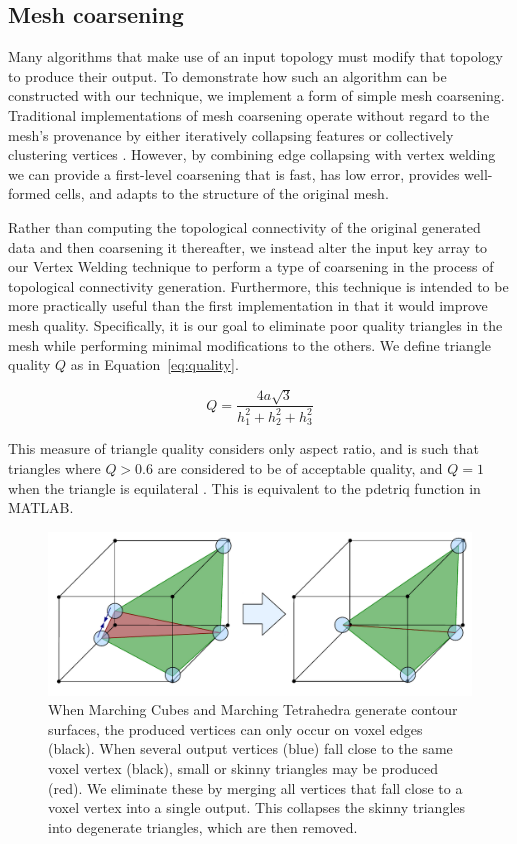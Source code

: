 \documentclass[review,journal]{vgtc}         %
\begin{document}
\subsection{Mesh coarsening}
\label{sec:coarsening}
Many algorithms that make use of an input topology must modify that topology to produce their output. To demonstrate how such an algorithm can be constructed with our technique, we implement a form of simple mesh coarsening. Traditional implementations of mesh coarsening operate without regard to the mesh's provenance by either iteratively collapsing features \cite{Potter2011} or collectively clustering vertices \cite{DeCoro2007}.  However, by combining edge collapsing with vertex welding we can provide a first-level coarsening that is fast, has low error, provides well-formed cells, and adapts to the structure of the original mesh.

Rather than computing the topological connectivity of the original generated data and then coarsening it thereafter, we instead alter the input key array to our Vertex Welding technique to perform a type of coarsening in the process of topological connectivity generation. Furthermore, this technique is intended to be more practically useful than the first implementation in that it would improve mesh quality. Specifically, it is our goal to eliminate poor quality triangles in the mesh while performing minimal modifications to the others. We define triangle quality $Q$ as in Equation~\ref{eq:quality}.

\begin{equation}
\label{eq:quality}
	Q = \frac{4a\sqrt{3}}{h_1^2 + h_2^2 + h_3^2}
\end{equation}

This measure of triangle quality considers only aspect ratio, and is such that triangles where $Q > 0.6$ are considered to be of acceptable quality, and $Q = 1$ when the triangle is equilateral \cite{Bank2003}. This is equivalent to the pdetriq function in MATLAB.

\begin{figure}[!t]
\begin{center}
\includegraphics[width=\columnwidth]{SkinnyCollapse.pdf}
\caption{When Marching Cubes and Marching Tetrahedra generate contour surfaces, the produced vertices can only occur on voxel edges (black). When several output vertices (blue) fall close to the same voxel vertex (black), small or skinny triangles may be produced (red). We eliminate these by merging all vertices that fall close to a voxel vertex into a single output. This collapses the skinny triangles into degenerate triangles, which are then removed. }
\label{fig:SkinnyCollapse}
\end{center}
\end{figure}
\end{document}
